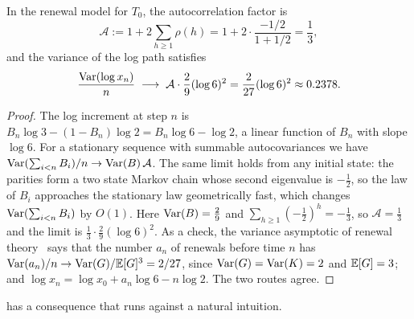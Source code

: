 \begin{corollary}\label{cor:longrun}
In the renewal model for $T_0$, the autocorrelation factor is
\[
  \mathcal{A}:=1+2\sum_{h\geq1}\rho(h)=1+2\cdot\frac{-1/2}{1+1/2}=\frac13 ,
\]
and the variance of the log path satisfies
\[
  \frac{\operatorname{Var}(\log x_n)}{n}\;\longrightarrow\;\mathcal{A}\cdot\frac29(\log6)^2
  =\frac{2}{27}(\log6)^2\approx0.2378 .
\]
\end{corollary}

\begin{proof}
The log increment at step $n$ is $B_n\log3-(1-B_n)\log2=B_n\log6-\log2$, a
linear function of $B_n$ with slope $\log6$. For a stationary sequence with
summable autocovariances we have
$\operatorname{Var}(\sum_{i<n}B_i)/n\to\operatorname{Var}(B)\,\mathcal{A}$.
The same limit holds from any initial state: the parities form a two state Markov chain whose second eigenvalue is $-\tfrac12$, so the law of $B_i$ approaches the stationary law geometrically fast, which changes $\operatorname{Var}(\sum_{i<n}B_i)$ by $O(1)$.
Here $\operatorname{Var}(B)=\frac29$ and $\sum_{h\geq1}(-\tfrac12)^h=-\tfrac13$, so
$\mathcal{A}=\frac13$ and the limit is $\frac13\cdot\frac29(\log6)^2$. As a
check, the variance asymptotic of renewal theory~\cite[Theorem~III.9.1]{gut1988} says that the
number $a_n$ of renewals before time $n$ has
$\operatorname{Var}(a_n)/n\to\operatorname{Var}(G)/\mathbb{E}[G]^3=2/27$, since $\operatorname{Var}(G)=\operatorname{Var}(K)=2$ and
$\mathbb{E}[G]=3$; and $\log x_n=\log x_0+a_n\log6-n\log2$. The two routes agree.
\end{proof}

 has a consequence that runs against a natural intuition.

